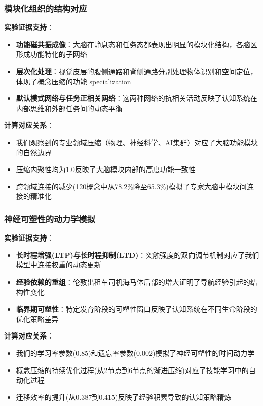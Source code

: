 \documentclass[12pt,a4paper]{article}
\begin{document}
\subsubsection{模块化组织的结构对应}

\textbf{实验证据支持}：
\begin{itemize}
\item \textbf{功能磁共振成像}：大脑在静息态和任务态都表现出明显的模块化结构，各脑区形成功能特化的子网络
\item \textbf{层次化处理}：视觉皮层的腹侧通路和背侧通路分别处理物体识别和空间定位，体现了概念压缩的功能 specialization
\item \textbf{默认模式网络与任务正相关网络}：这两种网络的抗相关活动反映了认知系统在内部思维和外部任务间的动态平衡
\end{itemize}

\textbf{计算对应关系}：
\begin{itemize}
\item 我们观察到的专业领域压缩（物理、神经科学、AI集群）对应了大脑功能模块的自然边界
\item 压缩内聚性均为1.0反映了大脑模块内部的高度功能一致性
\item 跨领域连接的减少(120概念中从78.2\%降至65.3\%)模拟了专家大脑中模块间连接的精准化
\end{itemize}

\subsubsection{神经可塑性的动力学模拟}

\textbf{实验证据支持}：
\begin{itemize}
\item \textbf{长时程增强(LTP)与长时程抑制(LTD)}：突触强度的双向调节机制对应了我们模型中连接权重的动态更新
\item \textbf{经验依赖的重组}：伦敦出租车司机海马体后部的增大证明了导航经验引起的结构性变化
\item \textbf{临界期可塑性}：特定发育阶段的可塑性窗口反映了认知系统在不同生命阶段的优化策略差异
\end{itemize}

\textbf{计算对应关系}：
\begin{itemize}
\item 我们的学习率参数(0.85)和遗忘率参数(0.002)模拟了神经可塑性的时间动力学
\item 概念压缩的持续优化过程(从2节点到6节点的渐进压缩)对应了技能学习中的自动化过程
\item 迁移效率的提升(从0.387到0.415)反映了经验积累导致的认知策略精炼
\end{itemize}
\end{document}
